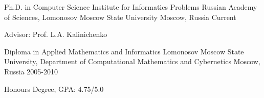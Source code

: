 \begin{cventries}
  \cventry
    {Ph.D. in Computer Science}
    {Institute for Informatics Problems Russian Academy of Sciences, 
    Lomonosov Moscow State University}
    {Moscow, Russia}
    {Current}
    {
      \begin{cvitems}
        \item {Advisor: Prof. L.A. Kalinichenko}
      \end{cvitems}
    }
    \cventry
    {Diploma in Applied Mathematics and Informatics}
    {Lomonosov Moscow State University, 
    Department of Computational Mathematics and Cybernetics}
    {Moscow, Russia}
    {2005-2010}
    {
      \begin{cvitems}
        \item {Honours Degree, GPA: 4.75/5.0}
      \end{cvitems}
    }
\end{cventries}
